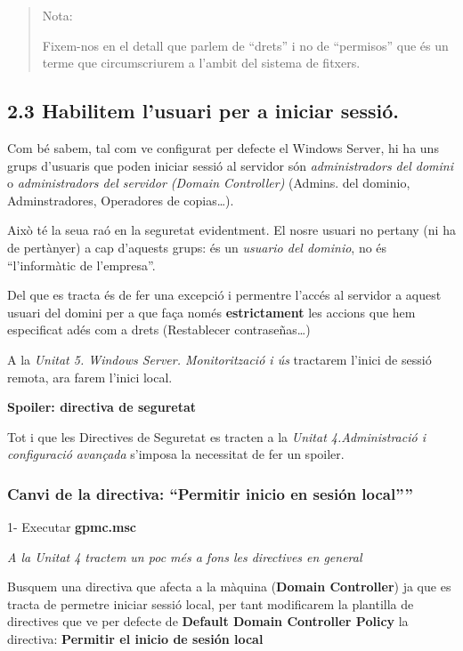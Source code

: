\documentclass[
  a4paper,
]{article}
\begin{document}
\begin{quote}
Nota:

Fixem-nos en el detall que parlem de ``drets'' i no de ``permisos'' que
és un terme que circumscriurem a l'ambit del sistema de fitxers.
\end{quote}

\subsection{2.3 Habilitem l'usuari per a iniciar
sessió.}\label{habilitem-lusuari-per-a-iniciar-sessiuxf3.}

Com bé sabem, tal com ve configurat per defecte el Windows Server, hi ha
uns grups d'usuaris que poden iniciar sessió al servidor són
\emph{administradors del domini} o \emph{administradors del servidor
(Domain Controller)} (Admins. del dominio, Adminstradores, Operadores de
copias\ldots).

Això té la seua raó en la seguretat evidentment. El nosre usuari no
pertany (ni ha de pertànyer) a cap d'aquests grups: és un \emph{usuario
del dominio}, no és ``l'informàtic de l'empresa''.

Del que es tracta és de fer una excepció i permentre l'accés al servidor
a aquest usuari del domini per a que faça només \textbf{estrictament}
les accions que hem especificat adés com a drets (Restablecer
contraseñas\ldots)

A la \emph{Unitat 5. Windows Server. Monitorització i ús} tractarem
l'inici de sessió remota, ara farem l'inici local.

\textbf{Spoiler: directiva de seguretat}

Tot i que les Directives de Seguretat es tracten a la \emph{Unitat
4.Administració i configuració avançada} s'imposa la necessitat de fer
un spoiler.

\subsubsection{\texorpdfstring{Canvi de la directiva: ``Permitir inicio
en sesión
local''''}{Canvi de la directiva: ``Permitir inicio en sesión local''\,''}}\label{canvi-de-la-directiva-permitir-inicio-en-sesiuxf3n-local}

1- Executar \textbf{gpmc.msc}

\emph{A la Unitat 4 tractem un poc més a fons les directives en general}

Busquem una directiva que afecta a la màquina (\textbf{Domain
Controller}) ja que es tracta de permetre iniciar sessió local, per tant
modificarem la plantilla de directives que ve per defecte de
\textbf{Default Domain Controller Policy} la directiva: \textbf{Permitir
el inicio de sesión local}
\end{document}
